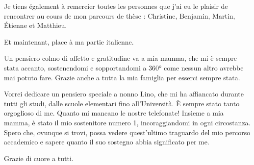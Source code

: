 \begin{remerciements}
Je tiens également à remercier toutes les personnes que j'ai eu le plaisir de rencontrer au cours de mon parcours de thèse : Christine, Benjamin, Martin, Étienne et Matthieu.

Et maintenant, place à ma partie italienne.

Un pensiero colmo di affetto e gratitudine va a
mia mamma, che mi è sempre stata accanto, sostenendomi e sopportandomi a 360°
come nessun altro avrebbe mai potuto fare. 
Grazie anche a tutta la mia famiglia per esserci sempre stata.

Vorrei dedicare un pensiero speciale a nonno Lino, che mi ha affiancato durante
tutti gli studi, dalle scuole elementari fino all'Università. È sempre stato
tanto orgoglioso di me. Quanto mi mancano le nostre telefonate! Insieme a mia
mamma, è stato il mio sostenitore numero 1, incoraggiandomi in ogni circostanza.
Spero che, ovunque si trovi, possa vedere quest'ultimo traguardo del mio
percorso accademico e sapere quanto il suo sostegno abbia significato per me.

Grazie di cuore a tutti.


\end{remerciements}
